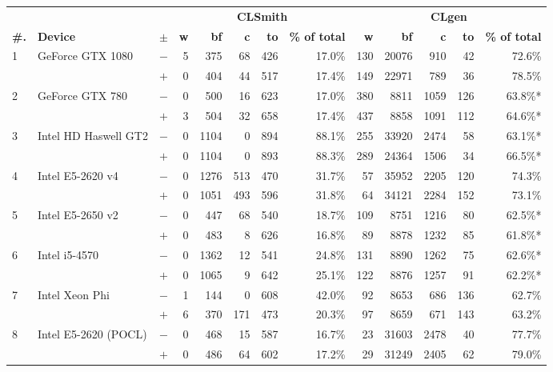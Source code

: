   \begin{tabular}{lll | rrrrr | rrrrr }
  \toprule
  & & & \multicolumn{5}{c|}{\textbf{CLSmith}} & \multicolumn{5}{c}{\textbf{CLgen}} \\
  \textbf{\#.} & \textbf{Device} & $\pm$ &
  \textbf{w} & \textbf{bf} & \textbf{c} & \textbf{to} & \textbf{\% of total} &
  \textbf{w} & \textbf{bf} & \textbf{c} & \textbf{to} & \textbf{\% of total} \\
  \midrule
  \multirow{ 2}{*}{1} & \multirow{ 2}{*}{GeForce GTX 1080} & $-$ & 5 & 375 & 68 & 426 & 17.0\%       & 130 & 20076 & 910 & 42 & 72.6\% \\& & $+$ & 0 & 404 & 44 & 517 & 17.4\% & 149 & 22971 & 789 & 36 & 78.5\% \\
\hline
\multirow{ 2}{*}{2} & \multirow{ 2}{*}{GeForce GTX 780} & $-$ & 0 & 500 & 16 & 623 & 17.0\%       & 380 & 8811 & 1059 & 126 & 63.8\%* \\& & $+$ & 3 & 504 & 32 & 658 & 17.4\% & 437 & 8858 & 1091 & 112 & 64.6\%* \\
\hline
\multirow{ 2}{*}{3} & \multirow{ 2}{*}{Intel HD Haswell GT2} & $-$ & 0 & 1104 & 0 & 894 & 88.1\%       & 255 & 33920 & 2474 & 58 & 63.1\%* \\& & $+$ & 0 & 1104 & 0 & 893 & 88.3\% & 289 & 24364 & 1506 & 34 & 66.5\%* \\
\hline
\multirow{ 2}{*}{4} & \multirow{ 2}{*}{Intel E5-2620 v4} & $-$ & 0 & 1276 & 513 & 470 & 31.7\%       & 57 & 35952 & 2205 & 120 & 74.3\% \\& & $+$ & 0 & 1051 & 493 & 596 & 31.8\% & 64 & 34121 & 2284 & 152 & 73.1\% \\
\hline
\multirow{ 2}{*}{5} & \multirow{ 2}{*}{Intel E5-2650 v2} & $-$ & 0 & 447 & 68 & 540 & 18.7\%       & 109 & 8751 & 1216 & 80 & 62.5\%* \\& & $+$ & 0 & 483 & 8 & 626 & 16.8\% & 89 & 8878 & 1232 & 85 & 61.8\%* \\
\hline
\multirow{ 2}{*}{6} & \multirow{ 2}{*}{Intel i5-4570} & $-$ & 0 & 1362 & 12 & 541 & 24.8\%       & 131 & 8890 & 1262 & 75 & 62.6\%* \\& & $+$ & 0 & 1065 & 9 & 642 & 25.1\% & 122 & 8876 & 1257 & 91 & 62.2\%* \\
\hline
\multirow{ 2}{*}{7} & \multirow{ 2}{*}{Intel Xeon Phi} & $-$ & 1 & 144 & 0 & 608 & 42.0\%       & 92 & 8653 & 686 & 136 & 62.7\% \\& & $+$ & 6 & 370 & 171 & 473 & 20.3\% & 97 & 8659 & 671 & 143 & 63.2\% \\
\hline
\multirow{ 2}{*}{8} & \multirow{ 2}{*}{Intel E5-2620 (POCL)} & $-$ & 0 & 468 & 15 & 587 & 16.7\%       & 23 & 31603 & 2478 & 40 & 77.7\% \\& & $+$ & 0 & 486 & 64 & 602 & 17.2\% & 29 & 31249 & 2405 & 62 & 79.0\% \\

\end{tabular}
